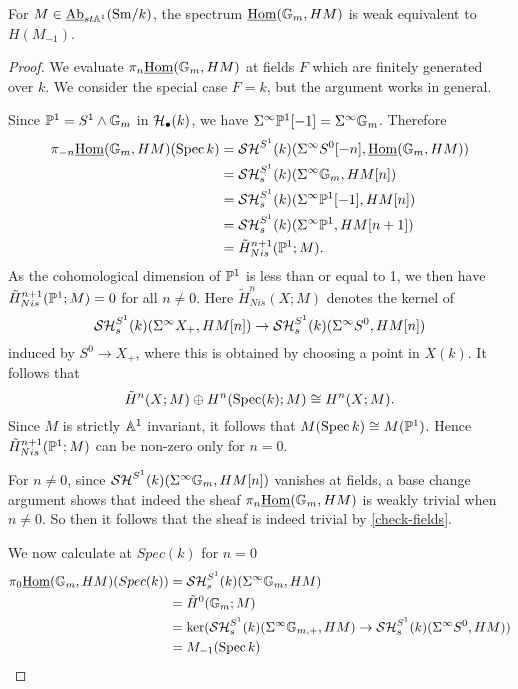 \documentclass{amsart}%
\begin{document}
\begin{proposition}
  For $M \in \operatorname{\underline{Ab}}_{st\mathbb{A}^1}(\mathrm{Sm}/k)$, the spectrum
  $\underline{\operatorname{Hom}}(\mathbb{G}_m, HM)$ is weak equivalent to $H(M_{-1})$.
\end{proposition}

\begin{proof}
  We evaluate $\pi_n\underline{\operatorname{Hom}}(\mathbb{G}_m,HM)$ at fields $F$ which
  are finitely generated over $k$. We consider the special case $F=k$,
  but the argument works in general.

  Since $\mathbb{P}^1 = S^1 \wedge \mathbb{G}_m$ in $\mathcal{H}_{\bullet}(k)$, we have
  $\Sigma^{\infty} \mathbb{P}^1 [-1] = \Sigma^{\infty} \mathbb{G}_m$. Therefore 
  \begin{align*}
    \pi_{-n}\underline{\operatorname{Hom}}(\mathbb{G}_m, HM)(\operatorname{Spec} k) 
    & = \mathcal{SH}^{S^1}(k)(\Sigma^{\infty}S^0[-n],\underline{\operatorname{Hom}}(\mathbb{G}_m, HM)) \\
    & = \mathcal{SH}^{S^1}_s(k)(\Sigma^{\infty}\mathbb{G}_m, HM[n]) \\
    & = \mathcal{SH}^{S^1}_s(k)(\Sigma^{\infty}\mathbb{P}^1 [-1], HM[n]) \\
    & = \mathcal{SH}^{S^1}_s(k)(\Sigma^{\infty}\mathbb{P}^1, HM[n+1])\\
    & = \tilde{H}^{n+1}_{Nis}(\mathbb{P}^1;M).
  \end{align*}
  As the cohomological dimension of $\mathbb{P}^1$ is less than or equal to
  1, we then have $\tilde{H}^{n+1}_{Nis}(\mathbb{P}^1;M) = 0$ for all
  $n \neq 0$. Here $\tilde{H}^{n}_{Nis}(X;M)$ denotes the kernel of
\begin{equation*}
  \mathcal{SH}^{S^1}_s(k)(\Sigma^{\infty}X_+, HM[n]) \to
  \mathcal{SH}^{S^1}_s(k)(\Sigma^{\infty}S^0, HM[n])
\end{equation*}
  induced by $S^0 \to X_+$, where this is obtained by choosing a point
  in $X(k)$. It follows that 
  \begin{equation*}
    \tilde{H}^n(X;M) \oplus H^n(\operatorname{Spec}(k);M) \cong H^n(X;M).
  \end{equation*}
  Since $M$ is strictly $\mathbb{A}^1$ invariant, it follows that
  $M(\operatorname{Spec} k) \cong M(\mathbb{P}^1)$. Hence $\tilde{H}^{n+1}_{Nis}(\mathbb{P}^1;M)$
  can be non-zero only for $n = 0$. 
  
  For $n\neq 0$, since $\mathcal{SH}^{S^1}(k)(\Sigma^{\infty}\mathbb{G}_m, HM[n])$
  vanishes at fields, a base change argument shows that indeed the
  sheaf $\pi_n \underline{\operatorname{Hom}}(\mathbb{G}_m, HM)$ is weakly trivial when
  $n\neq 0$. So then it follows that the sheaf is indeed trivial by
  \ref{check-fields}.

  We now calculate at $Spec(k)$ for $n=0$
  \begin{align*}
    \pi_0 \underline{\operatorname{Hom}}(\mathbb{G}_m, HM)(Spec(k))    
    & = \mathcal{SH}^{S^1}_s(k)(\Sigma^{\infty}\mathbb{G}_m, HM) \\
    & = \tilde{H}^0(\mathbb{G}_m; M) \\
    & = \ker( \mathcal{SH}^{S^1}_s(k)(\Sigma^{\infty}\mathbb{G}_{m,+}, HM) \to \mathcal{SH}^{S^1}_s(k)(\Sigma^{\infty}S^0, HM) )\\
    & = M_{-1}(\operatorname{Spec} k)
  \end{align*}


\end{proof}
\end{document}
